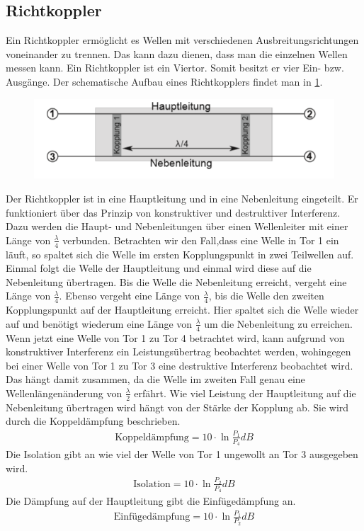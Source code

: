 \subsection{Richtkoppler}
Ein Richtkoppler ermöglicht es Wellen mit verschiedenen Ausbreitungsrichtungen voneinander zu trennen. Das kann dazu dienen, dass man die einzelnen Wellen messen kann. Ein Richtkoppler ist ein Viertor. Somit besitzt er vier Ein- bzw. Ausgänge. Der schematische Aufbau eines Richtkopplers findet man in \cref{RB}. 
\begin{figure}[h!]
	\centering
	\includegraphics[scale = 1]{Richt-Bild.PNG}
	\caption{}
	\label{RB}
\end{figure}
Der Richtkoppler ist in eine Hauptleitung und in eine Nebenleitung eingeteilt. Er funktioniert über das Prinzip von konstruktiver und destruktiver Interferenz. Dazu werden die Haupt- und Nebenleitungen über einen Wellenleiter mit  einer Länge von $\frac{\lambda}{4}$ verbunden. Betrachten wir den Fall,dass eine Welle in Tor 1 ein läuft, so spaltet sich die Welle im ersten Kopplungspunkt in zwei Teilwellen auf. Einmal folgt die Welle der Hauptleitung und einmal wird diese auf die Nebenleitung übertragen. Bis die Welle die Nebenleitung erreicht, vergeht eine Länge von $\frac{\lambda}{4}$. Ebenso vergeht eine Länge von $\frac{\lambda}{4}$, bis die Welle den zweiten Kopplungspunkt auf der Hauptleitung erreicht. Hier spaltet sich die Welle wieder auf und benötigt wiederum eine Länge von $\frac{\lambda}{4}$ um die Nebenleitung zu erreichen. Wenn jetzt eine Welle von Tor 1 zu Tor 4 betrachtet wird, kann aufgrund von konstruktiver Interferenz ein Leistungsübertrag beobachtet werden, wohingegen bei einer Welle von Tor 1 zu Tor 3 eine destruktive Interferenz beobachtet wird. Das hängt damit zusammen, da die Welle im zweiten Fall genau eine Wellenlängenänderung von $\frac{\lambda}{2}$ erfährt.
Wie viel Leistung der Hauptleitung auf die Nebenleitung übertragen wird hängt von der Stärke der Kopplung ab. Sie wird durch die Koppeldämpfung beschrieben.
\begin{align}
	\text{Koppeldämpfung} = 10\cdot \ln{\frac{P_1}{P_4}}dB
	\label{KppF}
\end{align}
Die Isolation gibt an wie viel der Welle von Tor 1 ungewollt an Tor 3 ausgegeben wird.
\begin{align}
	\text{Isolation} = 10\cdot \ln{\frac{P_2}{P_4}}dB
	\label{IsoF}
\end{align}
Die Dämpfung auf der Hauptleitung gibt die Einfügedämpfung an. 
\begin{align}
	\text{Einfügedämpfung} = 10\cdot \ln{\frac{P_1}{P_2}}dB
	\label{EinF}
\end{align}


